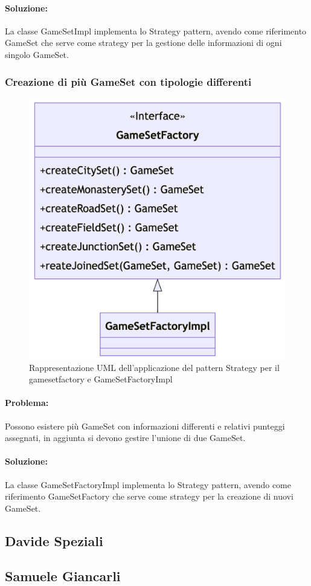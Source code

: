 \paragraph{Soluzione:} 
La classe GameSetImpl implementa lo Strategy pattern, avendo come riferimento GameSet che serve come strategy per la gestione delle informazioni di ogni singolo GameSet.

\subsubsection*{Creazione di più GameSet con tipologie differenti}
\begin{figure}[hh]
    \centering\includegraphics[scale=.3]{images/gamesetfactory.png}
    \caption{Rappresentazione UML dell'applicazione del pattern Strategy per il gamesetfactory e GameSetFactoryImpl}
\end{figure}

\paragraph{Problema:}
Possono esistere più GameSet con informazioni differenti e relativi punteggi assegnati, in aggiunta si devono gestire l'unione di due GameSet.
\paragraph{Soluzione:}
La classe GameSetFactoryImpl implementa lo Strategy pattern, avendo come riferimento GameSetFactory che serve come strategy per la creazione di nuovi GameSet.

\subsection*{Davide Speziali}

\subsection*{Samuele Giancarli}
